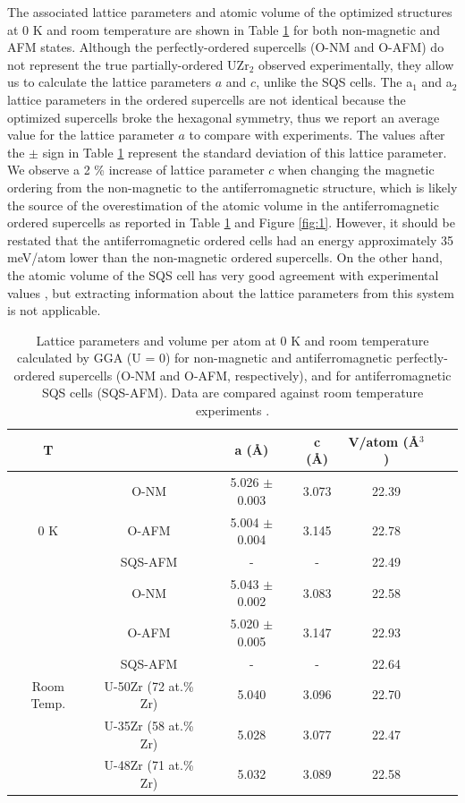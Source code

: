 \documentclass[preprint,12pt]{elsarticle}
\begin{document}
The associated lattice parameters and atomic volume of the optimized structures at 0 K and room temperature are shown in Table \ref{tab: cell parameters} for both non-magnetic and AFM states. Although the perfectly-ordered supercells (O-NM and O-AFM) do not represent the true partially-ordered UZr$_2$ observed experimentally, they allow us to calculate the lattice parameters $a$ and $c$, unlike the SQS cells. The a$_1$ and a$_2$ lattice parameters in the ordered supercells are not identical because the optimized supercells broke the hexagonal symmetry, thus we report an average value for the lattice parameter $a$ to compare with experiments. The values after the $\pm$ sign in Table \ref{tab: cell parameters} represent the standard deviation of this lattice parameter. We observe a 2 \% increase of lattice parameter $c$ when changing the magnetic ordering from the non-magnetic to the antiferromagnetic structure, which is likely the source of the overestimation of the atomic volume in the antiferromagnetic ordered supercells as reported in Table \ref{tab: cell parameters} and Figure \ref{fig:1}. However, it should be restated that the antiferromagnetic ordered cells had an energy approximately 35 meV/atom lower than the non-magnetic ordered supercells. On the other hand, the atomic volume of the SQS cell has very good agreement with experimental values \cite{akabori_lattice_1995, xie_phase_2022}, but extracting information about the lattice parameters from this system is not applicable.
\begin{table}[h!]
    \centering
    \caption{Lattice parameters and volume per atom at 0 K and room temperature calculated by GGA (U = 0) for non-magnetic and antiferromagnetic perfectly-ordered supercells (O-NM and O-AFM, respectively), and for antiferromagnetic SQS cells (SQS-AFM). Data are compared against room temperature experiments \cite{xie_phase_2022,akabori_lattice_1995}.} 
    \begin{tabular}{|c|c|c|c|c|c|c| }
    \hline
T &  &a (\AA)  & c (\AA) & V/atom (\AA$^3$)  \\
 \hline
       & O-NM   & 5.026 $\pm$ 0.003  &3.073 & 22.39\\
      0 K     & O-AFM      &  5.004 $\pm$ 0.004  & 3.145 & 22.78\\
   &  SQS-AFM       &  - & - & 22.49\\
   \hline
  &  O-NM   & 5.043  $\pm$ 0.002 &   3.083&  22.58 \\
                         &   O-AFM   & 5.020 $\pm$ 0.005  & 3.147 &  22.93 \\
                          &   SQS-AFM  &  -  & -   & 22.64  \\
       Room Temp.                     & U-50Zr (72 at.{\%} Zr) \cite{xie_phase_2022}  & 5.040   &3.096  & 22.70  \\
             & U-35Zr (58 at.{\%} Zr)  \cite{xie_phase_2022}  & 5.028   &3.077  &22.47   \\
                          & U-48Zr (71 at.{\%} Zr) \cite{akabori_lattice_1995} &5.032   &3.089  &  22.58\\
     \hline
    \end{tabular}
    \label{tab: cell parameters}
\end{table}
\end{document}
